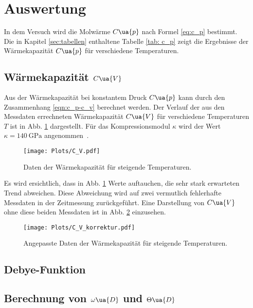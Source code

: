 \section{Auswertung}
\label{sec:auswertung}

In dem Versuch wird die Molwärme $C\ua{p}$ nach Formel \eqref{eq:c_p}
bestimmt. Die in Kapitel \ref{sec:tabellen} enthaltene Tabelle \ref{tab: c_p}
zeigt die Ergebnisse der Wärmekapazität $C\ua{p}$ für verschiedene Temperaturen.

\subsection{Wärmekapazität $C\ua{V}$}

Aus der Wärmekapazität bei konstantem Druck $C\ua{p}$ kann
durch den Zusammenhang \eqref{eqn:c_p-c_v} berechnet werden.
Der Verlauf der aus den Messdaten errechneten Wärmekapazität $C\ua{V}$
für verschiedene Temperaturen $T$ ist in Abb. \ref{fig:c_v} dargestellt.
Für das Kompressionsmodul $\kappa$ wird der Wert $\kappa = \SI{140}{\giga\pascal}$
angenommen~\cite{kompression}.

\begin{figure}
  \centering
  \texttt{[image: Plots/C\_V.pdf]}
  \caption{Daten der Wärmekapazität für steigende Temperaturen.}
  \label{fig:c_v}
\end{figure}

Es wird ersichtlich, dass in Abb. \ref{fig:c_v} Werte auftauchen, die sehr
stark erwarteten Trend abweichen.
Diese Abweichung wird auf zwei vermutlich fehlerhafte Messdaten in der Zeitmessung zurückgeführt.
Eine Darstellung von $C\ua{V}$ ohne diese beiden Messdaten ist in Abb. \ref{fig:c_v_korrektur}
einzusehen.

\begin{figure}
  \centering
  \texttt{[image: Plots/C\_V\_korrektur.pdf]}
  \caption{Angepasste Daten der Wärmekapazität für steigende Temperaturen.}
  \label{fig:c_v_korrektur}
\end{figure}

\subsection{Debye-Funktion}

\subsection{Berechnung von $\omega\ua{D}$ und $\Theta\ua{D}$}

